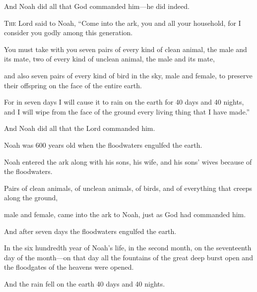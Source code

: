 \begin{scripture}
 And Noah did all that God commanded him---he did indeed.

 \allowchapbreak\hypertarget{ch-genesis-7}{}\lettrine[lines=5]{\color{pentateuch}T}{\textsc{he}} Lord said to Noah, ``Come into the ark, you and all your household, for I consider you godly among this generation.\everypar{}
 You must take with you seven pairs of every kind of clean animal, the male and its mate, two of every kind of unclean animal, the male and its mate,
 and also seven pairs of every kind of bird in the sky, male and female, to preserve their offspring on the face of the entire earth.
 For in seven days I will cause it to rain on the earth for 40 days and 40 nights, and I will wipe from the face of the ground every living thing that I have made.''
\everypar{}

 And Noah did all that the Lord commanded him.
\everypar{}

 Noah was 600 years old when the floodwaters engulfed the earth.
 Noah entered the ark along with his sons, his wife, and his sons' wives because of the floodwaters.
 Pairs of clean animals, of unclean animals, of birds, and of everything that creeps along the ground,
 male and female, came into the ark to Noah, just as God had commanded him.
 And after seven days the floodwaters engulfed the earth.
\everypar{}

 In the six hundredth year of Noah's life, in the second month, on the seventeenth day of the month---on that day all the fountains of the great deep burst open and the floodgates of the heavens were opened.
 And the rain fell on the earth 40 days and 40 nights.
\everypar{}


\end{scripture}
